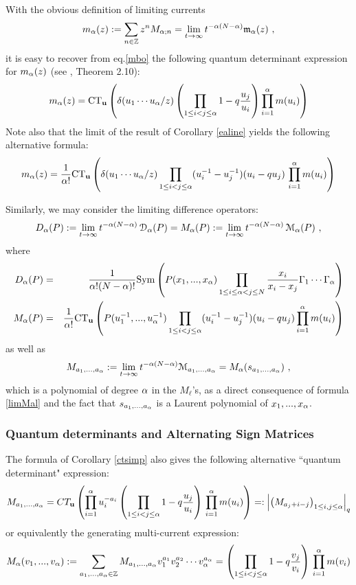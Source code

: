 With the obvious definition of limiting currents 
$$m_\al(z):=\sum_{n\in \Z} z^n M_{\al;n}=\lim_{t\to\infty}t^{-\al(N-\al)} {\mathfrak m}_\al(z)\ ,$$
it is easy to recover from eq.\eqref{mbo} the following quantum determinant expression for $m_{\alpha}(z)$
(see \cite{DFK16}, Theorem 2.10):
\begin{equation}\label{qdetmal} m_{\alpha}(z)={\rm CT}_{\mathbf u}\left(\delta(u_1\cdots u_{\alpha}/z) 
\left(\prod_{1\leq i<j\leq {\alpha}} 1-q \frac{u_j}{u_i}\right) \prod_{i=1}^{\alpha} m(u_i)\right) 
\end{equation}
Note also that the limit of the result of Corollary \ref{ealine} yields the following alternative formula:
$$ m_{\alpha}(z)=\frac{1}{{\alpha}!}{\rm CT}_{\mathbf u}\left(\delta(u_1\cdots u_{\alpha}/z) 
\prod_{1\leq i<j\leq {\alpha}} (u_i^{-1}-u_j^{-1})(u_i-q u_j)\,  \prod_{i=1}^{\alpha} m(u_i)\right) $$

Similarly, we may consider the limiting difference operators:
\begin{equation}\label{limitDM}
D_\al(P):=\lim_{t\to\infty} t^{-\al(N-\al)}\, {\mathcal D}_\al(P)= 
M_\al(P):=\lim_{t\to\infty} t^{-\al(N-\al)}\, {\mathcal M}_\al(P)\ ,
\end{equation}
where
\begin{eqnarray}
D_{\alpha}(P)&=&\frac{1}{{\alpha}!(N-{\alpha})!}{\rm Sym}\left(P(x_1,...,x_{\alpha}) 
\prod_{1\leq i\leq {\alpha}<j\leq N}\frac{x_i}{x_i-x_j} \Gamma_1\cdots \Gamma_{\alpha} \right)\label{limDal}\\
M_{\alpha}(P)&=&\frac{1}{{\alpha}!}{\rm CT}_{\mathbf u} \left(P(u_1^{-1},...,u_{\alpha}^{-1}) \prod_{1\leq i<j \leq {\alpha}}(u_i^{-1}-u_j^{-1})(u_i-q u_j)
\prod_{i=1}^{\alpha} m(u_i) \right) \label{limMal}
\end{eqnarray}
as well as 
$$M_{a_1,...,a_\al}:=\lim_{t\to \infty} t^{-\al(N-\al)} {\mathcal M}_{a_1,...,a_\al}=M_\al(s_{a_1,...,a_\al})\ ,$$
which is a polynomial of degree ${\alpha}$ in the $M_\ell$'s, as a direct consequence of formula \eqref{limMal} and the fact that
$s_{a_1,...,a_{\alpha}}$ is a Laurent polynomial of $x_1,...,x_{\alpha}$. 

\subsubsection{Quantum determinants and Alternating Sign Matrices}
The formula of Corollary \ref{ctsimp} also gives the following
alternative ``quantum determinant" expression:
\begin{equation}\label{ctsimplim}
{M}_{a_1,...,a_{\alpha}}=CT_{\mathbf u}\left(\prod_{i=1}^{\alpha} u_i^{-a_i}
 \left( \prod_{1\leq i<j\leq {\alpha}}1-q \frac{u_j}{u_i}\right)
\, \prod_{i=1}^{\alpha} {m}(u_i)\right)=: \left\vert \left( M_{a_j+i-j}\right)_{1\leq i,j\leq {\alpha}} \right\vert_q
\end{equation}
or equivalently the generating multi-current expression:
\begin{equation}\label{geneM}
M_{\alpha}(v_1,...,v_{\alpha}):=\sum_{a_1,...,a_{\alpha}\in{\mathbb Z}}{M}_{a_1,...,a_{\alpha}} v_1^{a_1}v_2^{a_2}\cdots v_{\alpha}^{a_{\alpha}}
=  \left(\prod_{1\leq i<j\leq {\alpha}}1-q \frac{v_j}{v_i}\right)\, \prod_{i=1}^{\alpha} {m}(v_i)
\end{equation}

